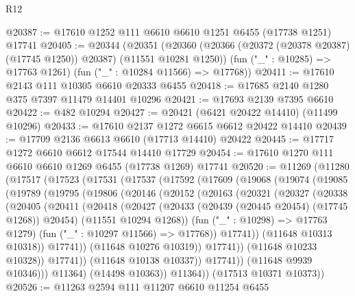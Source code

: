 \begin{lexlean}{R12}
\begin{coremodule}
@20387 := @17610 @1252 @111 @6610 @6610 @1251 @6455 (@17738 @1251) @17741
@20405 := @20344
    (@20351
      (@20360 (@20366 (@20372 (@20378 @20387) (@17745 @1250)) @20387) (@11551 @10281 @1250))
      (fun ("_" : @10285) => @17763 @1261)
      (fun ("_" : @10284 @11566) => @17768))
@20411 := @17610 @2143 @111 @10305 @6610 @20333 @6455
@20418 := @17685 @2140 @1280 @375 @7397 @11479 @14401 @10296
@20421 := @17693 @2139 @7395 @6610
@20422 := @482 @10294
@20427 := @20421 (@6421 @20422 @14410) (@11499 @10296)
@20433 := @17610 @2137 @1272 @6615 @6612 @20422 @14410
@20439 := @17709 @2136 @6613 @6610 (@17713 @14410) @20422
@20445 := @17717 @1272 @6610 @6612 @17544 @14410 @17729
@20454 := @17610 @1270 @111 @6610 @6610 @1269 @6455 (@17738 @1269) @17741
@20520 := @11269
    (@11280
      (@17517
        (@17523
          (@17531
            (@17537
              (@17592
                (@17609
                  (@19068
                    (@19074
                      (@19085
                        (@19789
                          (@19795
                            (@19806
                              (@20146
                                (@20152
                                  (@20163
                                    (@20321
                                      (@20327
                                        (@20338
                                          (@20405
                                            (@20411
                                              (@20418
                                                (@20427
                                                  (@20433
                                                    (@20439 (@20445 @20454) (@17745 @1268))
                                                    @20454)
                                                  (@11551 @10294 @1268))
                                                (fun ("_" : @10298) => @17763 @1279)
                                                (fun ("_" : @10297 @11566) => @17768))
                                              @17741))
                                          (@11648 @10313 @10318))
                                        @17741))
                                    (@11648 @10276 @10319))
                                  @17741))
                              (@11648 @10233 @10328))
                            @17741))
                        (@11648 @10138 @10337))
                      @17741))
                  (@11648 @9939 @10346)))
              @11364)
            (@14498 @10363))
          @11364))
      (@17513 @10371 @10373))
@20526 := @11263 @2594 @111 @11207 @6610 @11254 @6455

\end{coremodule}
\end{lexlean}
